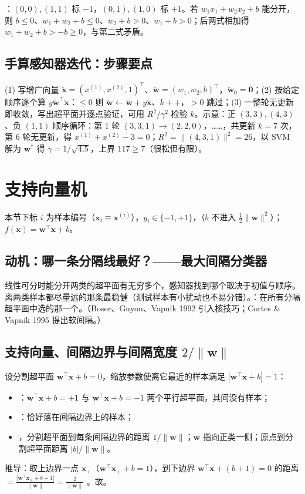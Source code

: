 ：$(0,0),(1,1)$ 标 $-1$，$(0,1),(1,0)$ 标 $+1$。若 $w_1x_1+w_2x_2+b$ 能分开，则 $b\le0$、$w_1+w_2+b\le0$、$w_2+b>0$、$w_1+b>0$；后两式相加得 $w_1+w_2+b>-b\ge0$，与第二式矛盾。

\subsection{手算感知器迭代：步骤要点}
(1) 写增广向量 $\tilde{\bm x}=(x^{(1)},x^{(2)},1)^\top$、$\tilde{\bm w}=(w_1,w_2,b)^\top$，$\tilde{\bm w}_0=\bm 0$；(2) 按给定顺序逐个算 $y\tilde{\bm w}^\top\tilde{\bm x}$：$\le0$ 则 $\tilde{\bm w}\leftarrow\tilde{\bm w}+y\tilde{\bm x}$、$k{+}{+}$，$>0$ 跳过；(3) 一整轮无更新即收敛，写出超平面并逐点验证，可用 $R^2/\gamma^2$ 检验 $k$。示意：正 $(3,3),(4,3)$、负 $(1,1)$ 顺序循环：第 1 轮 $(3,3,1)\to(2,2,0)$，……，共更新 $k=7$ 次，第 6 轮无更新，得 $x^{(1)}+x^{(2)}-3=0$；$R^2=\|(4,3,1)\|^2=26$，以 SVM 解为 $\bm w^*$ 得 $\gamma=1/\sqrt{4.5}$，上界 $117\ge7$（很松但有限）。

\section{支持向量机}\label{sec:D02b-svm}
本节下标 $i$ 为样本编号（$\bm x_i\equiv\bm x^{(i)}$），$y_i\in\{-1,+1\}$，（$b$ 不进入 $\frac12\|\bm w\|^2$）；$f(\bm x)=\bm w^\top\bm x+b$。

\subsection{动机：哪一条分隔线最好？——最大间隔分类器}
线性可分时能分开两类的超平面有无穷多个，感知器找到哪个取决于初值与顺序。离两类样本都尽量远的那条最稳健（测试样本有小扰动也不易分错）。：在所有分隔超平面中选的那一个。（Boser、Guyon、Vapnik 1992 引入核技巧；Cortes \& Vapnik 1995 提出软间隔。）

\subsection{支持向量、间隔边界与间隔宽度 \texorpdfstring{$2/\|\bm w\|$}{2/||w||}}
设分割超平面 $\bm w^\top\bm x+b=0$，缩放参数使离它最近的样本满足 $|\bm w^\top\bm x+b|=1$：
\begin{itemize}
\item {}：$\bm w^\top\bm x+b=+1$ 与 $\bm w^\top\bm x+b=-1$ 两个平行超平面，其间没有样本；
\item {}：恰好落在间隔边界上的样本；
\item {}，分割超平面到每条间隔边界的距离 $1/\|\bm w\|$；$\bm w$ 指向正类一侧；原点到分割超平面距离 $|b|/\|\bm w\|$。
\end{itemize}
推导：取上边界一点 $\bm x_+$（$\bm w^\top\bm x_++b=1$），到下边界 $\bm w^\top\bm x+(b+1)=0$ 的距离 $=\frac{|\bm w^\top\bm x_++b+1|}{\|\bm w\|}=\frac{2}{\|\bm w\|}$ 。故。

